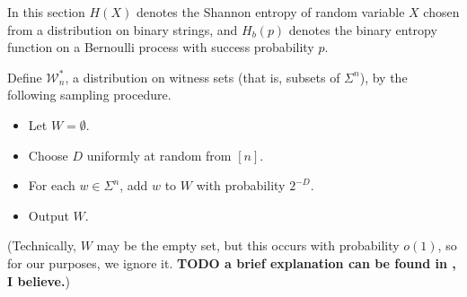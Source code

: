 \documentclass{article}
\newcommand{\todo}[1]{\textbf{TODO #1}}
\newcommand{\mc}{\mathcal}
\begin{document}
In this section $H(X)$ denotes the Shannon entropy of random variable $X$ chosen from a distribution on binary strings, and $H_b(p)$ denotes the binary entropy function on a Bernoulli process with success probability $p$.

Define $\mc{W}_n^*$, a distribution on witness sets (that is, subsets of $\Sigma^n$), by the following sampling procedure.
\begin{itemize}
\item Let $W = \emptyset$.
\item Choose $D$ uniformly at random from $[n]$.
\item For each $w \in \Sigma^n$, add $w$ to $W$ with probability $2^{-D}$.
\item Output $W$.
\end{itemize}
(Technically, $W$ may be the empty set, but this occurs with probability $o(1)$, so for our purposes, we ignore it.
\todo{a brief explanation can be found in \autocite{krw14}, I believe.})
\end{document}
